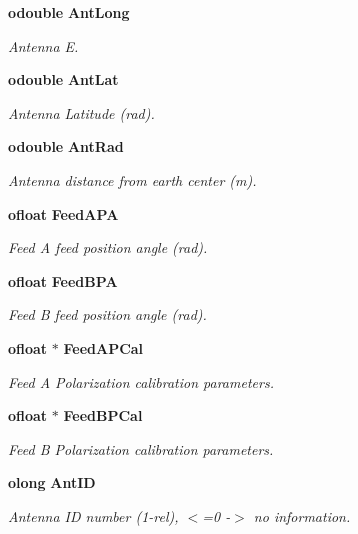 \begin{CompactItemize}
{\bf odouble} {\bf Ant\-Long}
\begin{CompactList}\small\item\em Antenna E. \item\end{CompactList}\item 
{\bf odouble} {\bf Ant\-Lat}
\begin{CompactList}\small\item\em Antenna Latitude (rad). \item\end{CompactList}\item 
{\bf odouble} {\bf Ant\-Rad}
\begin{CompactList}\small\item\em Antenna distance from earth center (m). \item\end{CompactList}\item 
{\bf ofloat} {\bf Feed\-APA}
\begin{CompactList}\small\item\em Feed A feed position angle (rad). \item\end{CompactList}\item 
{\bf ofloat} {\bf Feed\-BPA}
\begin{CompactList}\small\item\em Feed B feed position angle (rad). \item\end{CompactList}\item 
{\bf ofloat} $\ast$ {\bf Feed\-APCal}
\begin{CompactList}\small\item\em Feed A Polarization calibration parameters. \item\end{CompactList}\item 
{\bf ofloat} $\ast$ {\bf Feed\-BPCal}
\begin{CompactList}\small\item\em Feed B Polarization calibration parameters. \item\end{CompactList}\item 
{\bf olong} {\bf Ant\-ID}
\begin{CompactList}\small\item\em Antenna ID number (1-rel), $<$=0 -$>$ no information. \item\end{CompactList}\item 

\end{CompactItemize}

